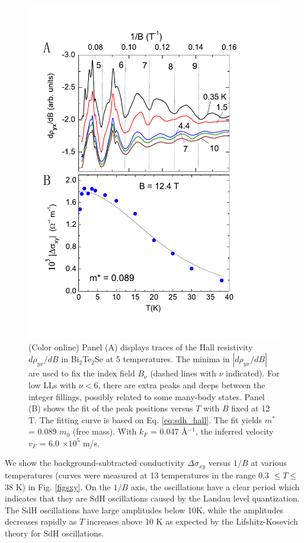\begin{figure}[!htbp]
  \begin{center}            
\includegraphics[width=0.9\linewidth]{ch-bts/figures/FigFitvsTemp.pdf} 
\caption{\label{figfit} (Color online) 
Panel (A) displays traces of the Hall resistivity 
$d\rho_{yx}/dB$ in Bi$_2$Te$_2$Se at 5 temperatures.  The minima in $|d\rho_{yx}/dB|$ are used to
fix the index field $B_{\nu}$ (dashed lines with $\nu$ indicated).  
For low LLs with $\nu<$6, there are extra peaks and deeps between the integer fillings, possibly related to some many-body states.
Panel (B) shows the fit of the peak positions versus $T$ with $B$ fixed at
12 T.  The fitting curve is based on Eq. \ref{eq:sdh_hall}. The fit yields $m^*$ = 0.089 $m_0$ (free mass).  With $k_F$ = 0.047 \AA$^{-1}$,
the inferred velocity $v_F$ = 6.0 $\times 10^5$ m/s.
} 
  \end{center}
\end{figure}

We show the background-subtracted conductivity $\Delta\sigma_{xy}$ versus $1/B$ at various temperatures (curves were measured at 13 temperatures in the range 0.3 $\le T\le$ 38 K) in Fig. \ref{figsxy}. On the $1/B$ axis, the oscillations have a clear period which indicates that they are SdH oscillations caused by the Landau level quantization. The SdH oscillations have large amplitudes below 10K, while the amplitudes decreases rapidly as $T$ increases above 10 K as expected by the Lifshitz-Kosevich theory for SdH oscillations.



